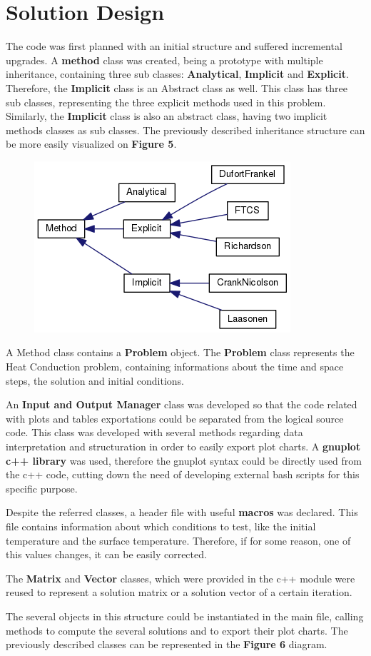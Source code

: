 \documentclass[12pt]{article}
\begin{document}
\section*{Solution Design}
\par The code was first planned with an initial structure and suffered incremental upgrades. A \textbf{method} class was created, being a prototype with multiple inheritance, containing three sub classes: \textbf{Analytical}, \textbf{Implicit} and \textbf{Explicit}. Therefore, the \textbf{Implicit} class is an Abstract class as well. This class has three sub classes, representing the three explicit methods used in this problem. Similarly, the \textbf{Implicit} class is also an abstract class, having two implicit methods classes as sub classes. The previously described inheritance structure can be more easily visualized on \textbf{Figure 5}.

\begin{figure}[!htb]
  \centering
  \includegraphics[width=.5\linewidth]{method_inheritance.png}
\end{figure}

\par A Method class contains a \textbf{Problem} object. The \textbf{Problem} class represents the Heat Conduction problem, containing informations about the time and space steps, the solution and initial conditions.
\par An \textbf{Input and Output Manager} class was developed so that the code related with plots and tables exportations could be separated from the logical source code. This class was developed with several methods regarding data interpretation and structuration in order to easily export plot charts. A \textbf{gnuplot c++ library} was used, therefore the gnuplot syntax could be directly used from the c++ code, cutting down the need of developing external bash scripts for this specific purpose.
\par Despite the referred classes, a header file with useful \textbf{macros} was declared. This file contains information about which conditions to test, like the initial temperature and the surface temperature. Therefore, if for some reason, one of this values changes, it can be easily corrected.
\par The \textbf{Matrix} and \textbf{Vector} classes, which were provided in the c++ module were reused to represent a solution matrix or a solution vector of a certain iteration.
\par The several objects in this structure could be instantiated in the main file, calling methods to compute the several solutions and to export their plot charts. The previously described classes can be represented in the \textbf{Figure 6} diagram.
\end{document}
